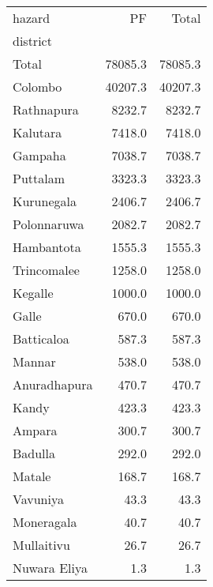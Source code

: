 \begin{tabular}{lrr}
\toprule
hazard &       PF &    Total \\
district     &          &          \\
\midrule
Total        &  78085.3 &  78085.3 \\
Colombo      &  40207.3 &  40207.3 \\
Rathnapura   &   8232.7 &   8232.7 \\
Kalutara     &   7418.0 &   7418.0 \\
Gampaha      &   7038.7 &   7038.7 \\
Puttalam     &   3323.3 &   3323.3 \\
Kurunegala   &   2406.7 &   2406.7 \\
Polonnaruwa  &   2082.7 &   2082.7 \\
Hambantota   &   1555.3 &   1555.3 \\
Trincomalee  &   1258.0 &   1258.0 \\
Kegalle      &   1000.0 &   1000.0 \\
Galle        &    670.0 &    670.0 \\
Batticaloa   &    587.3 &    587.3 \\
Mannar       &    538.0 &    538.0 \\
Anuradhapura &    470.7 &    470.7 \\
Kandy        &    423.3 &    423.3 \\
Ampara       &    300.7 &    300.7 \\
Badulla      &    292.0 &    292.0 \\
Matale       &    168.7 &    168.7 \\
Vavuniya     &     43.3 &     43.3 \\
Moneragala   &     40.7 &     40.7 \\
Mullaitivu   &     26.7 &     26.7 \\
Nuwara Eliya &      1.3 &      1.3 \\
\bottomrule
\end{tabular}
